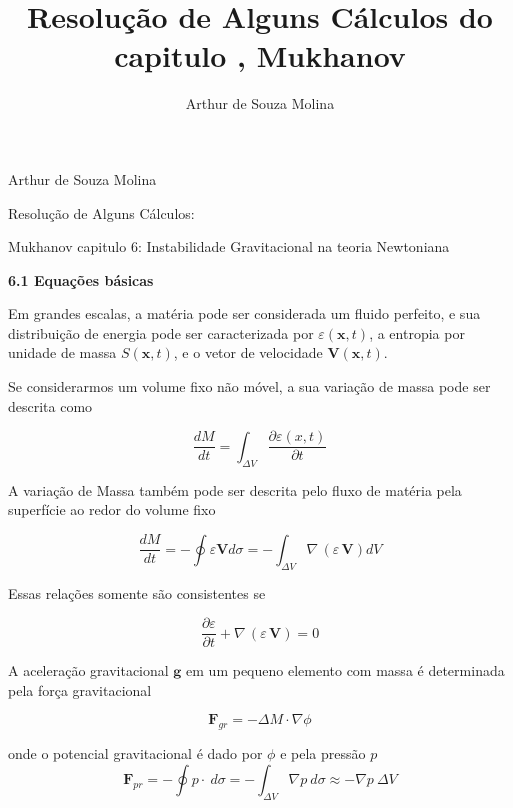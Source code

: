 \documentclass[a4paper,12pt]{article}
\author{Arthur de Souza Molina}
\title{Resolução de Alguns Cálculos do capitulo , Mukhanov}
\begin{document}
	Arthur de Souza Molina
	
	Resolução de Alguns Cálculos:
	
	Mukhanov capitulo 6: Instabilidade Gravitacional na teoria Newtoniana
	
\begin{center}
	\textbf{6.1 Equações básicas}

\end{center}

Em grandes escalas, a matéria pode ser considerada um fluido perfeito, e sua distribuição de energia pode ser caracterizada por $\varepsilon (\textbf{x},t)$, a entropia por unidade de massa $S(\textbf{x},t)$, e o vetor de velocidade $\textbf{V}(\textbf{x},t)$.

Se considerarmos um volume fixo não móvel, a sua variação de massa pode ser descrita como

\begin{equation}\label{eq1}
		\dfrac{dM}{dt} = \int_{\Delta V} \dfrac{\partial \varepsilon (x,t)}{\partial t}
\end{equation}

A variação de Massa também pode ser descrita pelo fluxo de matéria pela superfície ao redor do volume fixo

\begin{equation}\label{eq2}
	\dfrac{dM}{dt} = - \oint \varepsilon \textbf{V} d\sigma = - \int_{\Delta V} \nabla \,(\varepsilon \, \textbf{V}) dV
\end{equation}

Essas relações somente são consistentes se

\begin{equation}\label{eq3}
	\dfrac{\partial \varepsilon}{\partial t} +\nabla \,(\varepsilon \, \textbf{V}) = 0
\end{equation}

A aceleração gravitacional $\textbf{g}$ em um pequeno elemento com massa é determinada pela força gravitacional

\begin{equation}\label{eq4}
	\textbf{F}_{gr} = - \Delta M \cdot \nabla \phi
\end{equation}

onde o potencial gravitacional é dado por $\phi$ e pela pressão $\textit{p}$
\begin{equation}\label{eq5}
	\textbf{F}_{pr} = - \oint p \cdot\ d\sigma = - \int_{\Delta V} \nabla p\ d\sigma \approx - \nabla p \ \Delta V
\end{equation}
\end{document}
